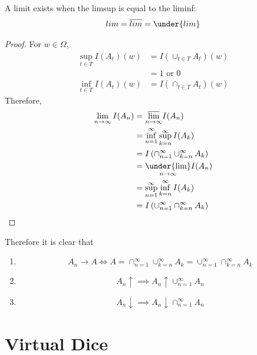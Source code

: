 \documentclass[11pt]{article}
\numberwithin{equation}{section}
\begin{document}
\proposition A limit exists when the limsup is equal to the liminf:
\begin{equation}
	lim = \overline{lim} = \under{lim}
\end{equation}
\begin{proof}
For $w \in \Omega$,
	\begin{align}
		\sup_{t \in T} I(A_t)(w) &= I(\cup_{t\in T} A_t)(w) \\
		&= 1 \text{ or } 0 \\
		\inf_{t \in T} I(A_t)(w) &= I(\cap_{t\in T} A_t)(w)
	\end{align}
Therefore,
\begin{align}
	\lim_{n \rightarrow \infty} I(A_n) &= \underset{n \rightarrow \infty}{\overline{\lim}} I(A_n) \\
	&= \inf_{n=1}^\infty \sup_{k=n}^\infty I(A_k) \\
	&= I\left(\cap_{n=1}^\infty \cup_{k=n}^\infty A_k \right) \\
	&= \underset{n \rightarrow \infty}{\under{\lim}} I(A_n) \\
	&= \sup_{n=1}^\infty \inf_{k=n}^\infty I(A_k) \\
	&= I\left(\cup_{n=1}^\infty \cap_{k=n}^\infty A_k \right)
\end{align}
\end{proof}
\property Therefore it is clear that
\begin{enumerate}
	\item \begin{equation}
	A_n \rightarrow A \iff A = \cap_{n=1}^\infty \cup_{k=n}^\infty A_k = \cup_{n=1}^\infty \cap_{k=n}^\infty A_k
\end{equation}
	\item 
	\begin{equation} \label{monotone sequence limit 1}
		A_n \uparrow \implies A_n \uparrow \cup_{n=1}^\infty A_n
	\end{equation}
	\item
	\begin{equation} \label{monotone sequence limit 2}
		A_n \downarrow \implies A_n \downarrow \cap_{n=1}^\infty A_n
	\end{equation}

\end{enumerate}

\section{Virtual Dice}
\end{document}
